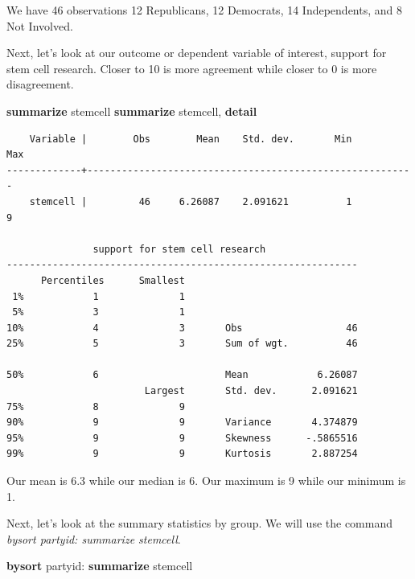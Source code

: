 \documentclass[
]{book}
\newenvironment{Shaded}{\begin{snugshade}}{\end{snugshade}}
\newcommand{\KeywordTok}[1]{\textcolor[rgb]{0.13,0.29,0.53}{\textbf{#1}}}
\newcommand{\NormalTok}[1]{#1}
\begin{document}
We have 46 observations 12 Republicans, 12 Democrats, 14 Independents, and 8 Not Involved.

Next, let's look at our outcome or dependent variable of interest, support for stem cell research. Closer to 10 is more agreement while closer to 0 is more disagreement.

\begin{Shaded}
\begin{Highlighting}[]
\KeywordTok{summarize}\NormalTok{ stemcell}
\KeywordTok{summarize}\NormalTok{ stemcell, }\KeywordTok{detail}
\end{Highlighting}
\end{Shaded}

\begin{verbatim}
    Variable |        Obs        Mean    Std. dev.       Min        Max
-------------+---------------------------------------------------------
    stemcell |         46     6.26087    2.091621          1          9

               support for stem cell research
-------------------------------------------------------------
      Percentiles      Smallest
 1%            1              1
 5%            3              1
10%            4              3       Obs                  46
25%            5              3       Sum of wgt.          46

50%            6                      Mean            6.26087
                        Largest       Std. dev.      2.091621
75%            8              9
90%            9              9       Variance       4.374879
95%            9              9       Skewness      -.5865516
99%            9              9       Kurtosis       2.887254
\end{verbatim}

Our mean is 6.3 while our median is 6. Our maximum is 9 while our minimum is 1.

Next, let's look at the summary statistics by group. We will use the command \emph{bysort partyid: summarize stemcell}.

\begin{Shaded}
\begin{Highlighting}[]
\KeywordTok{bysort}\NormalTok{ partyid: }\KeywordTok{summarize}\NormalTok{ stemcell}
\end{Highlighting}
\end{Shaded}
\end{document}
